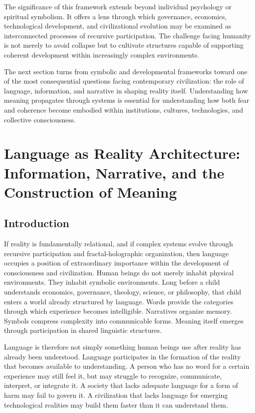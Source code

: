 \documentclass[12pt]{article}
\begin{document}
The significance of this framework extends beyond individual psychology or spiritual symbolism. It offers a lens through which governance, economics, technological development, and civilizational evolution may be examined as interconnected processes of recursive participation. The challenge facing humanity is not merely to avoid collapse but to cultivate structures capable of supporting coherent development within increasingly complex environments.

The next section turns from symbolic and developmental frameworks toward one of the most consequential questions facing contemporary civilization: the role of language, information, and narrative in shaping reality itself. Understanding how meaning propagates through systems is essential for understanding how both fear and coherence become embodied within institutions, cultures, technologies, and collective consciousness.

\section{Language as Reality Architecture: Information, Narrative, and the Construction of Meaning}

\subsection{Introduction}

If reality is fundamentally relational, and if complex systems evolve through recursive participation and fractal-holographic organization, then language occupies a position of extraordinary importance within the development of consciousness and civilization. Human beings do not merely inhabit physical environments. They inhabit symbolic environments. Long before a child understands economics, governance, theology, science, or philosophy, that child enters a world already structured by language. Words provide the categories through which experience becomes intelligible. Narratives organize memory. Symbols compress complexity into communicable forms. Meaning itself emerges through participation in shared linguistic structures.

Language is therefore not simply something human beings use after reality has already been understood. Language participates in the formation of the reality that becomes available to understanding. A person who has no word for a certain experience may still feel it, but may struggle to recognize, communicate, interpret, or integrate it. A society that lacks adequate language for a form of harm may fail to govern it. A civilization that lacks language for emerging technological realities may build them faster than it can understand them.
\end{document}

